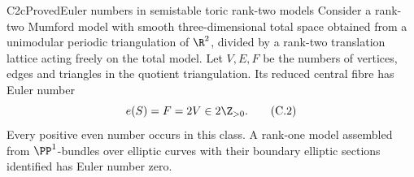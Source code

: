 \begin{statement}{C2c}{Proved}{Euler numbers in semistable toric rank-two models}
Consider a rank-two Mumford model with smooth three-dimensional total space obtained from a unimodular periodic triangulation of $\R^2$, divided by a rank-two translation lattice acting freely on the total model. Let $V,E,F$ be the numbers of vertices, edges and triangles in the quotient triangulation. Its reduced central fibre has Euler number
\[
 e(S)=F=2V\in2\Z_{>0}.                                \tag{C.2}
\]
Every positive even number occurs in this class. A rank-one model assembled from $\PP^1$-bundles over elliptic curves with their boundary elliptic sections identified has Euler number zero.
\end{statement}
